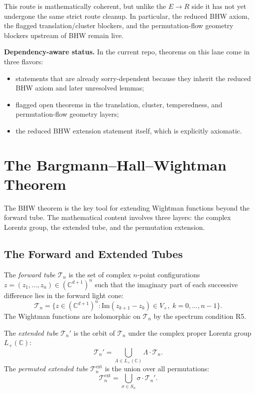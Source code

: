 \documentclass[11pt,a4paper]{article}
\begin{document}
\noindent
This route is mathematically coherent, but unlike the $E \to R$ side it has not
yet undergone the same strict route cleanup. In particular, the reduced BHW
axiom, the flagged translation/cluster blockers, and the permutation-flow
geometry blockers upstream of BHW remain live.

\medskip\noindent
\textbf{Dependency-aware status.}
In the current repo, theorems on this lane come in three flavors:
\begin{itemize}
\item statements that are already sorry-dependent because they inherit the
  reduced BHW axiom and later unresolved lemmas;
\item flagged open theorems in the translation, cluster, temperedness, and
  permutation-flow geometry layers;
\item the reduced BHW extension statement itself, which is explicitly axiomatic.
\end{itemize}


\section{The Bargmann--Hall--Wightman Theorem}

The BHW theorem is the key tool for extending Wightman functions beyond
the forward tube. The mathematical content involves three layers:
the complex Lorentz group, the extended tube, and the permutation extension.

\subsection{The Forward and Extended Tubes}

The \emph{forward tube} $\mathscr{T}_n$ is the set of complex $n$-point
configurations $z = (z_1, \ldots, z_n) \in (\mathbb{C}^{d+1})^n$ such that
the imaginary part of each successive difference lies in the forward light cone:
\[
\mathscr{T}_n = \{z \in (\mathbb{C}^{d+1})^n :
\mathrm{Im}(z_{k+1} - z_k) \in V_+, \; k = 0, \ldots, n{-}1\}.
\]
The Wightman functions are holomorphic on $\mathscr{T}_n$ by the spectrum
condition R5.

The \emph{extended tube} $\mathscr{T}_n'$ is the orbit of $\mathscr{T}_n$
under the complex proper Lorentz group $L_+(\mathbb{C})$:
\[
\mathscr{T}_n' = \bigcup_{\Lambda \in L_+(\mathbb{C})} \Lambda \cdot \mathscr{T}_n.
\]
The \emph{permuted extended tube} $\mathscr{T}_n^{\mathrm{ext}}$ is the union
over all permutations:
\[
\mathscr{T}_n^{\mathrm{ext}} = \bigcup_{\sigma \in S_n} \sigma \cdot \mathscr{T}_n'.
\]
\end{document}
